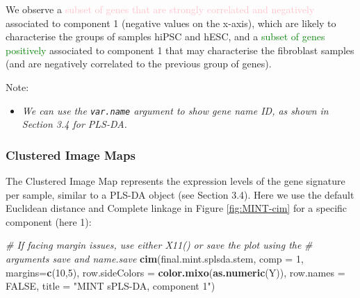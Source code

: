 \documentclass[]{book}
\newenvironment{Shaded}{\begin{snugshade}}{\end{snugshade}}
\newcommand{\KeywordTok}[1]{\textcolor[rgb]{0.13,0.29,0.53}{\textbf{#1}}}
\newcommand{\DataTypeTok}[1]{\textcolor[rgb]{0.13,0.29,0.53}{#1}}
\newcommand{\DecValTok}[1]{\textcolor[rgb]{0.00,0.00,0.81}{#1}}
\newcommand{\StringTok}[1]{\textcolor[rgb]{0.31,0.60,0.02}{#1}}
\newcommand{\CommentTok}[1]{\textcolor[rgb]{0.56,0.35,0.01}{\textit{#1}}}
\newcommand{\OtherTok}[1]{\textcolor[rgb]{0.56,0.35,0.01}{#1}}
\newcommand{\NormalTok}[1]{#1}
\providecommand{\tightlist}{%
  \setlength{\itemsep}{0pt}\setlength{\parskip}{0pt}}
\begin{document}
We observe a
\textcolor{pink}{subset of genes that are strongly correlated and negatively}
associated to component 1 (negative values on the x-axis), which are
likely to characterise the groups of samples hiPSC and hESC, and a
\textcolor{green}{subset of genes positively} associated to component 1
that may characterise the fibroblast samples (and are negatively
correlated to the previous group of genes).

Note:

\begin{itemize}
\tightlist
\item
  \emph{We can use the \texttt{var.name} argument to show gene name ID,
  as shown in Section 3.4 for PLS-DA.}
\end{itemize}

\subsubsection{Clustered Image Maps}\label{clustered-image-maps}

The Clustered Image Map represents the expression levels of the gene
signature per sample, similar to a PLS-DA object (see Section 3.4). Here
we use the default Euclidean distance and Complete linkage in Figure
\ref{fig:MINT-cim} for a specific component (here 1):

\begin{Shaded}
\begin{Highlighting}[]
\CommentTok{# If facing margin issues, use either X11() or save the plot using the}
\CommentTok{# arguments save and name.save}
\KeywordTok{cim}\NormalTok{(final.mint.splsda.stem, }\DataTypeTok{comp =} \DecValTok{1}\NormalTok{, }\DataTypeTok{margins=}\KeywordTok{c}\NormalTok{(}\DecValTok{10}\NormalTok{,}\DecValTok{5}\NormalTok{), }
    \DataTypeTok{row.sideColors =} \KeywordTok{color.mixo}\NormalTok{(}\KeywordTok{as.numeric}\NormalTok{(Y)), }\DataTypeTok{row.names =} \OtherTok{FALSE}\NormalTok{,}
    \DataTypeTok{title =} \StringTok{"MINT sPLS-DA, component 1"}\NormalTok{)}
\end{Highlighting}
\end{Shaded}
\end{document}
